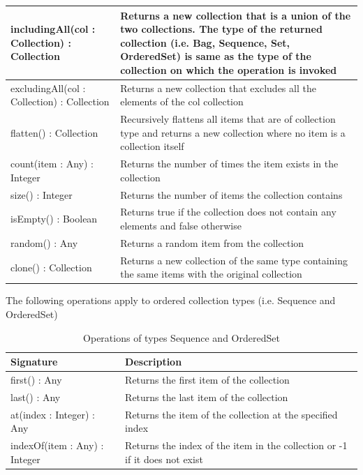 \begin{longtable} {|p{5.5cm}|p{6.5cm}|}
			includingAll(col : Collection) : Collection & Returns a new collection that is a union of the two collections. The type of the returned collection (i.e. Bag, Sequence, Set, OrderedSet) is same as the type of the collection on which the operation is invoked \\\hline
			
			excludingAll(col : Collection) : Collection & Returns a new collection that excludes all the elements of the col collection \\\hline
			
			flatten() : Collection & Recursively flattens all items that are of collection type and returns a new collection where no item is a collection itself \\\hline
			
			count(item : Any) : Integer & Returns the number of times the item exists in the collection \\\hline
			
			size() : Integer & Returns the number of items the collection contains \\\hline
			
			isEmpty() : Boolean & Returns true if the collection does not contain any elements and false otherwise \\\hline
	
			random() : Any & Returns a random item from the collection \\\hline
			
			clone() : Collection & Returns a new collection of the same type containing the same items with the original collection \\\hline
			
\end{longtable}

The following operations apply to ordered collection types (i.e. Sequence and OrderedSet)

\begin{longtable} {|p{5.5cm}|p{6.5cm}|}
			
			\caption{Operations of types Sequence and OrderedSet}
			\label{tab:SortedOperations}\\
			
			\hline
							
			\textbf{Signature} & \textbf{Description} \\\hline

			first() : Any & Returns the first item of the collection  \\\hline
				
			last() : Any & Returns the last item of the collection  \\\hline
	
			at(index : Integer) : Any & Returns the item of the collection at the specified index \\\hline
	
			indexOf(item : Any) : Integer & Returns the index of the item in the collection or -1 if it does not exist \\\hline
			
\end{longtable}

